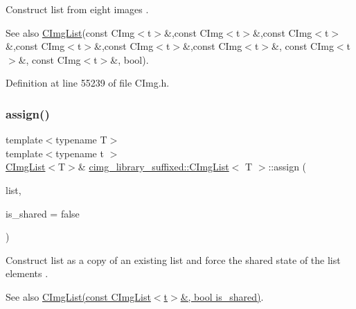 Construct list from eight images . 

\begin{DoxySeeAlso}{See also}
\hyperlink{structcimg__library__suffixed_1_1CImgList}{C\+Img\+List}(const C\+Img$<$t$>$\&,const C\+Img$<$t$>$\&,const C\+Img$<$t$>$\&,const C\+Img$<$t$>$\&,const C\+Img$<$t$>$\&,const C\+Img$<$t$>$\&, const C\+Img$<$t$>$\&, const C\+Img$<$t$>$\&, bool). 
\end{DoxySeeAlso}


Definition at line 55239 of file C\+Img.\+h.

\mbox{\label{structcimg__library__suffixed_1_1CImgList_aea8246a41cbc6f014e3a44757bdae0ec}} 
\subsubsection{\texorpdfstring{assign()}{assign()}\hspace{0.1cm}{\footnotesize\ttfamily [16/18]}}
{\footnotesize\ttfamily template$<$typename T$>$ \\
template$<$typename t $>$ \\
\hyperlink{structcimg__library__suffixed_1_1CImgList}{C\+Img\+List}$<$T$>$\& \hyperlink{structcimg__library__suffixed_1_1CImgList}{cimg\+\_\+library\+\_\+suffixed\+::\+C\+Img\+List}$<$ T $>$\+::assign (\begin{DoxyParamCaption}\item[{const \hyperlink{structcimg__library__suffixed_1_1CImgList}{C\+Img\+List}$<$ t $>$ \&}]{list,  }\item[{const bool}]{is\+\_\+shared = {\ttfamily false} }\end{DoxyParamCaption})\hspace{0.3cm}{\ttfamily [inline]}}



Construct list as a copy of an existing list and force the shared state of the list elements . 

\begin{DoxySeeAlso}{See also}
\hyperlink{structcimg__library__suffixed_1_1CImgList_aab7354258426b0c99e502eda3765b056}{C\+Img\+List(const C\+Img\+List$<$t$>$\&, bool is\+\_\+shared)}. 
\end{DoxySeeAlso}


